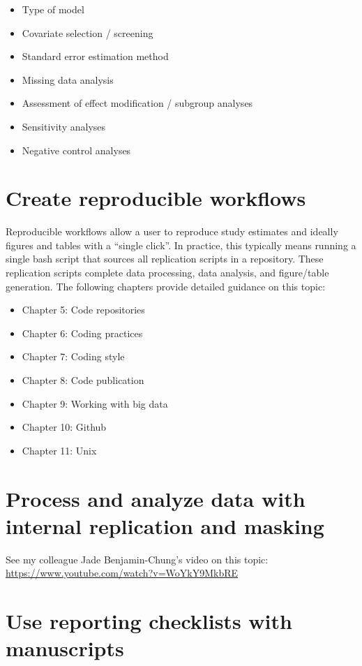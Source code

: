 \documentclass[
]{book}
\providecommand{\tightlist}{%
  \setlength{\itemsep}{0pt}\setlength{\parskip}{0pt}}
\begin{document}
\begin{itemize}
\tightlist
\item
  Type of model
\item
  Covariate selection / screening
\item
  Standard error estimation method
\item
  Missing data analysis
\item
  Assessment of effect modification / subgroup analyses
\item
  Sensitivity analyses
\item
  Negative control analyses
\end{itemize}

\section{Create reproducible workflows}\label{create-reproducible-workflows}

Reproducible workflows allow a user to reproduce study estimates and ideally figures and tables with a ``single click''. In practice, this typically means running a single bash script that sources all replication scripts in a repository. These replication scripts complete data processing, data analysis, and figure/table generation. The following chapters provide detailed guidance on this topic:

\begin{itemize}
\tightlist
\item
  Chapter 5: Code repositories
\item
  Chapter 6: Coding practices
\item
  Chapter 7: Coding style
\item
  Chapter 8: Code publication
\item
  Chapter 9: Working with big data
\item
  Chapter 10: Github
\item
  Chapter 11: Unix
\end{itemize}

\section{Process and analyze data with internal replication and masking}\label{process-and-analyze-data-with-internal-replication-and-masking}

See my colleague Jade Benjamin-Chung's video on this topic: \url{https://www.youtube.com/watch?v=WoYkY9MkbRE}

\section{Use reporting checklists with manuscripts}\label{use-reporting-checklists-with-manuscripts}
\end{document}
